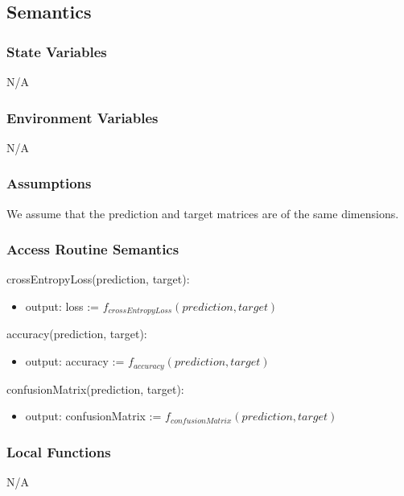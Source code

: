 \documentclass[12pt, titlepage]{article}
\begin{document}
\subsection{Semantics}

\subsubsection{State Variables}

N/A

\subsubsection{Environment Variables}

N/A

\subsubsection{Assumptions}

We assume that the prediction and target matrices are of the same dimensions.

\subsubsection{Access Routine Semantics}

\noindent crossEntropyLoss(prediction, target):
\begin{itemize}
\item output: loss := $f_{crossEntropyLoss}(prediction, target)$
\end{itemize}

\noindent accuracy(prediction, target):
\begin{itemize}
\item output: accuracy := $f_{accuracy}(prediction, target)$
\end{itemize}

\noindent confusionMatrix(prediction, target):
\begin{itemize}
\item output: confusionMatrix := $f_{confusionMatrix}(prediction, target)$

\end{itemize}

\subsubsection{Local Functions}

N/A
\end{document}
